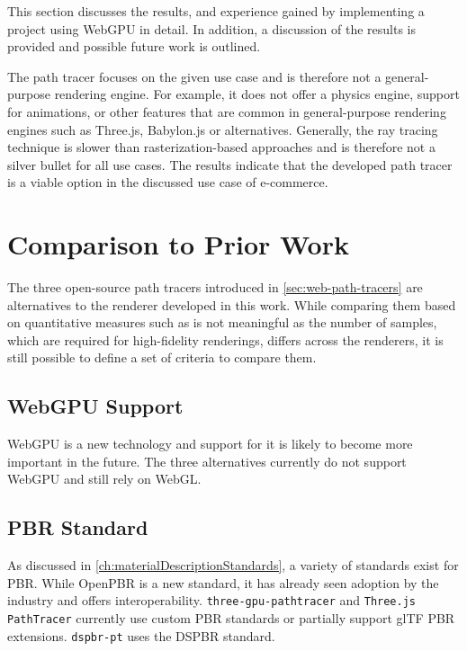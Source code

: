 
This section discusses the results, and experience gained by implementing a project using \gls{WebGPU} in detail. In addition, a discussion of the results is provided and possible future work is outlined.

The path tracer focuses on the given use case and is therefore not a general-purpose rendering engine. For example, it does not offer a physics engine, support for animations, or other features that are common in general-purpose rendering engines such as \gls{Three.js}, \gls{Babylon.js} or alternatives. Generally, the ray tracing technique is slower than rasterization-based approaches and is therefore not a silver bullet for all use cases. The results indicate that the developed path tracer is a viable option in the discussed use case of e-commerce.

\section{Comparison to Prior Work}
\label{sec:comparisonToPriorWork}

The three open-source path tracers introduced in \autoref{sec:web-path-tracers} are alternatives to the renderer developed in this work. While comparing them based on quantitative measures such as  is not meaningful as the number of samples, which are required for high-fidelity renderings, differs across the renderers, it is still possible to define a set of criteria to compare them.


\subsection*{WebGPU Support}

\gls{WebGPU} is a new technology and support for it is likely to become more important in the future. The three alternatives currently do not support \gls{WebGPU} and still rely on \gls{WebGL}.

\subsection*{PBR Standard}

As discussed in \autoref{ch:materialDescriptionStandards}, a variety of standards exist for \gls{PBR}. While \gls{OpenPBR} is a new standard, it has already seen adoption by the industry and offers interoperability. \texttt{three-gpu-pathtracer} and \texttt{Three.js PathTracer} currently use custom \gls{PBR} standards or partially support \gls{glTF} PBR extensions. \texttt{dspbr-pt} uses the \gls{DSPBR} standard.

